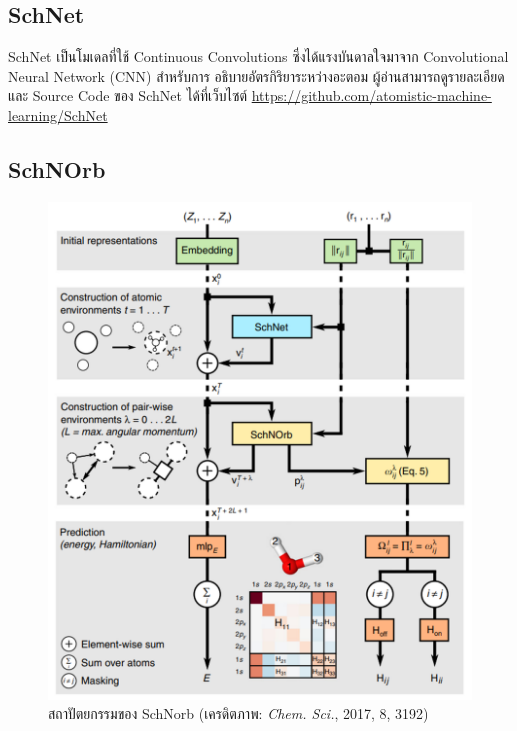 \subsection{SchNet}
\label{ssec:schnet}

SchNet เป็นโมเดลที่ใช้ Continuous Convolutions ซึ่งได้แรงบันดาลใจมาจาก Convolutional Neural Network (CNN) สำหรับการ%
อธิบายอัตรกิริยาระหว่างอะตอม\autocite{schutt2017,schutt2018} ผู้อ่านสามารถดูรายละเอียดและ Source Code ของ SchNet ได้ที่เว็บไซต์ 
\url{https://github.com/atomistic-machine-learning/SchNet}

\subsection{SchNOrb}
\label{ssec:schnorb}

\begin{figure}[H]
    \centering
    \includegraphics[width=0.9\linewidth]{fig/schnorb.png}
    \caption{สถาปัตยกรรมของ SchNorb (เครดิตภาพ: \textit{Chem. Sci.}, 2017, 8, 3192)}
    \label{fig:schnorb_architect}
\end{figure}

